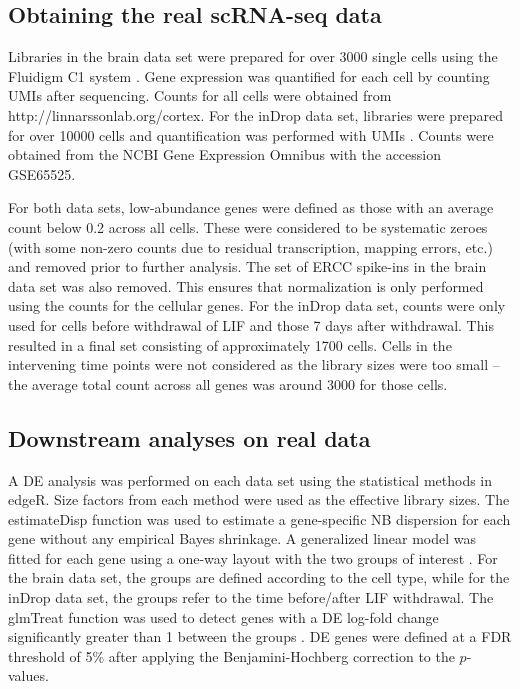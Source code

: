\documentclass{bmcart}
\begin{document}
\subsection*{Obtaining the real scRNA-seq data}
Libraries in the brain data set were prepared for over 3000 single cells using the Fluidigm C1 system \cite{zeisel2015brain}.
Gene expression was quantified for each cell by counting UMIs after sequencing.
Counts for all cells were obtained from {http://linnarssonlab.org/cortex}.
For the inDrop data set, libraries were prepared for over 10000 cells and quantification was performed with UMIs \cite{klein2015droplet}.
Counts were obtained from the NCBI Gene Expression Omnibus with the accession GSE65525.

For both data sets, low-abundance genes were defined as those with an average count below 0.2 across all cells.
These were considered to be systematic zeroes (with some non-zero counts due to residual transcription, mapping errors, etc.) and removed prior to further analysis.
The set of ERCC spike-ins in the brain data set was also removed.
This ensures that normalization is only performed using the counts for the cellular genes.
For the inDrop data set, counts were only used for cells before withdrawal of LIF and those 7 days after withdrawal.
This resulted in a final set consisting of approximately 1700 cells.
Cells in the intervening time points were not considered as the library sizes were too small -- the average total count across all genes was around 3000 for those cells.

\subsection*{Downstream analyses on real data}
A DE analysis was performed on each data set using the statistical methods in edgeR.
Size factors from each method were used as the effective library sizes.
The estimateDisp function was used to estimate a gene-specific NB dispersion for each gene \cite{chen2014differential} without any empirical Bayes shrinkage.
A generalized linear model was fitted for each gene using a one-way layout with the two groups of interest \cite{mccarthy2012differential}.
For the brain data set, the groups are defined according to the cell type, while for the inDrop data set, the groups refer to the time before/after LIF withdrawal.
The glmTreat function was used to detect genes with a DE log-fold change significantly greater than 1 between the groups \cite{mccarthy2009testing}.
DE genes were defined at a FDR threshold of 5\% after applying the Benjamini-Hochberg correction to the $p$-values.
\end{document}
